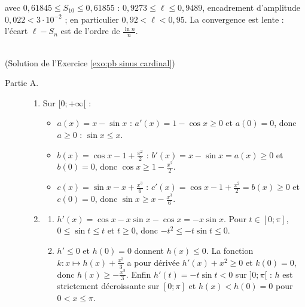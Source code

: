 \begin{corrige}
\begin{sol}
\begin{description}
\begin{enumerate}
\begin{enumerate}
                  avec $0{,}61845 \leq S_{10} \leq 0{,}61855$ :
                  $0{,}9273 \leq \ell \leq 0{,}9489$, encadrement d'amplitude $0{,}022 < 3\cdot 10^{-2}$ ; en particulier
                  $\boxed{0{,}92 < \ell < 0{,}95}$. La convergence est lente : l'\'ecart $\ell - S_n$ est de l'ordre de $\frac{\ln n}{n}$.
            \end{enumerate}
      \end{enumerate}
\end{description}
\end{sol}

\begin{sol} ~ \\
(Solution de l'Exercice \ref{exo:pb sinus cardinal})
\begin{description}
\item[Partie A.] \begin{enumerate}
      \item Sur $[0 ; +\infty[$ :
            \begin{itemize}
            \item $a(x) = x - \sin x$ : $a'(x) = 1 - \cos x \geq 0$ et $a(0) = 0$, donc $a \geq 0$ : $\sin x \leq x$.
            \item $b(x) = \cos x - 1 + \frac{x^2}{2}$ : $b'(x) = x - \sin x = a(x) \geq 0$ et $b(0) = 0$, donc $\cos x \geq 1 - \frac{x^2}{2}$.
            \item $c(x) = \sin x - x + \frac{x^3}{6}$ : $c'(x) = \cos x - 1 + \frac{x^2}{2} = b(x) \geq 0$ et $c(0) = 0$, donc
                  $\sin x \geq x - \frac{x^3}{6}$.
            \end{itemize}
      \item \begin{enumerate}
            \item $h'(x) = \cos x - x\sin x - \cos x = -x\sin x$. Pour $t \in [0 ; \pi]$, $0 \leq \sin t \leq t$ et $t \geq 0$, donc
                  $-t^2 \leq -t\sin t \leq 0$.
            \item $h' \leq 0$ et $h(0) = 0$ donnent $h(x) \leq 0$. La fonction $k : x \mapsto h(x) + \frac{x^3}{3}$ a pour d\'eriv\'ee
                  $h'(x) + x^2 \geq 0$ et $k(0) = 0$, donc $h(x) \geq -\frac{x^3}{3}$.
                  Enfin $h'(t) = -t\sin t < 0$ sur $]0 ; \pi[$ : $h$ est strictement d\'ecroissante sur $[0 ; \pi]$ et $h(x) < h(0) = 0$
                  pour $0 < x \leq \pi$.
            \end{enumerate}

\end{enumerate}
\end{description}
\end{sol}
\end{corrige}
